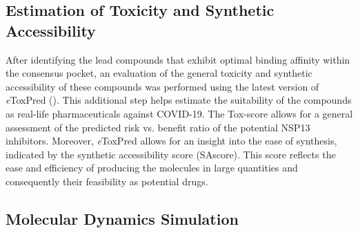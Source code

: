 \documentclass[11pt, letterpaper, titlepage]{article}
\renewcommand{\cite}{\parencite}
\begin{document}
\subsection{Estimation of Toxicity and Synthetic Accessibility}
 After identifying the lead compounds that exhibit optimal binding affinity within the consensus pocket, an evaluation of the general toxicity and synthetic accessibility of these compounds was performed using the latest version of \textit{e}ToxPred (\cite{pu2019toxpred}). This additional step helps estimate the suitability of the compounds as real-life pharmaceuticals against COVID-19. The Tox-score allows for a general assessment of the predicted risk vs. benefit ratio of the potential NSP13 inhibitors. Moreover, \textit{e}ToxPred allows for an insight into the ease of synthesis, indicated by the synthetic accessibility score (SAscore). This score reflects the ease and efficiency of producing the molecules in large quantities and consequently their feasibility as potential drugs. 

\subsection{Molecular Dynamics Simulation}
\end{document}
